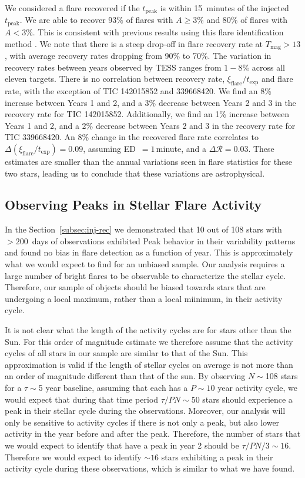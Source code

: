 \documentclass[twocolumn]{aastex631}
\begin{document}
We considered a flare recovered if the $t_\textrm{peak}$ is within 15~minutes of
the injected $t_\textrm{peak}$. We are able to recover 93\% of flares with
$A \geq 3$\% and 80\% of flares with $A < 3$\%. This is consistent with previous
results using this flare identification method \citep{feinstein20}. We note that
there is a steep drop-off in flare recovery rate at $T_\textrm{mag} > 13$, with
average recovery rates dropping from  90\% to 70\%.  The variation in recovery rates
between years observed by TESS ranges from $1 - 8$\% across all eleven targets.
There is no correlation between recovery rate,  $\xi_\textrm{flare}/t_\textrm{exp}$
and flare rate, with the exception of TIC 142015852 and 339668420. We find an 8\%
increase between Years 1 and 2, and a 3\% decrease between Years 2 and 3 in the
recovery rate for TIC 142015852. Additionally, we find an 1\% increase between
Years 1 and 2, and a 2\% decrease between Years 2 and 3 in the recovery rate for
TIC 339668420. An 8\% change in the recovered flare rate correlates to
$\Delta (\xi_\textrm{flare} / t_\textrm{exp}) = 0.09$, assuming ED~$= 1$\,minute,
and a $\Delta \mathcal{R} = 0.03$. These estimates are smaller than the annual
variations seen in flare statistics for these two stars, leading us to conclude
that these variations are astrophysical.


\subsection{Observing Peaks in Stellar Flare Activity}

In the Section~\ref{subsec:inj-rec} we demonstrated that 10 out of 108 stars with
$> 200$~days of observations exhibited Peak behavior in their variability patterns
and found no bias in flare detection as a function of year. This is approximately
what we would expect to find for an unbiased sample. Our analysis requires a large
number of bright flares to be observable to characterize the stellar cycle. Therefore,
our sample of objects should be biased towards stars that are undergoing a local
maximum, rather than a local miinimum, in their activity cycle.

It is not clear what the length of the activity cycles are for stars other than
the Sun. For this order of magnitude estimate we therefore assume that the activity
cycles of all stars in our sample are similar to that of the Sun. This approximation
is valid   if the length of stellar cycles on average is not more than an order
of magnitude different than that of the sun. By observing $N\sim$108 stars for a
$\tau\sim$5 year baseline, assuming that each has a $P\sim10$ year activity cycle,
we would expect that during that time period $\tau /P N\sim50$ stars should
experience a peak in their stellar cycle during the observations. Moreover, our
analysis will only be sensitive to activity cycles if there is not only a peak,
but also lower activity in the year before and after the peak. Therefore, the
number of stars that we would expect to identify that have a peak in year 2 should
be $\tau /P N /3\sim16$. Therefore we would expect to identify $\sim16$ stars
exhibiting a peak in their activity cycle during these observations, which is
similar to what we have found.
\end{document}
